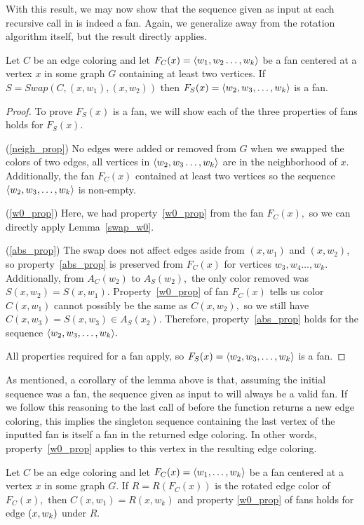 With this result, we may now show that the sequence given as input at each recursive call in  is indeed a fan. Again, we generalize away from the rotation algorithm itself, but the result directly applies.
\begin{lemma}\label{rot_fan}
    Let $C$ be an edge coloring and let $F_C(x) = \langle w_1, w_2 \dots, w_k \rangle$ be a fan centered at a vertex $x$ in some graph $G$ containing at least two vertices. If $S = Swap(C, (x, w_1), (x, w_2))$ then $F_S(x) = \langle w_2, w_3, \dots, w_k \rangle$ is a fan.
\end{lemma}
\begin{proof}
    To prove $F_S(x)$ is a fan, we will show each of the three properties of fans holds for $F_S(x).$
    
    (\ref{neigh_prop}) No edges were added or removed from $G$ when we swapped the colors of two edges, all vertices in $\langle w_2, w_3 \dots, w_k \rangle$ are in the neighborhood of $x.$ Additionally, the fan $F_C(x)$ contained at least two vertices so the sequence $\langle w_2, w_3, \dots, w_k \rangle$ is non-empty.

    (\ref{w0_prop}) Here, we had property~\ref{w0_prop} from the fan $F_C(x),$ so we can directly apply Lemma~\ref{swap_w0}.

    (\ref{abs_prop}) The swap does not affect edges aside from $(x, w_1)$ and $(x, w_2)$, so property~\ref{abs_prop} is preserved from $F_C(x)$ for vertices $w_3, w_4 \dots, w_k.$ Additionally, from $A_C(w_2)$ to $A_S(w_2),$ the only color removed was $S(x, w_2) = S(x, w_1).$ Property~\ref{w0_prop} of fan $F_C(x)$ tells us color $C(x, w_1)$ cannot possibly be the same as $C(x, w_2),$ so we still have $C(x, w_3) = S(x, w_3) \in A_S(x_2).$ Therefore, property~\ref{abs_prop} holds for the sequence $\langle w_2, w_3, \dots, w_k \rangle.$
    
    All properties required for a fan apply, so $F_{S}(x) = \langle w_2, w_3, \dots, w_k \rangle$ is a fan.
\end{proof}
As mentioned, a corollary of the lemma above is that, assuming the initial sequence was a fan, the sequence given as input to  will always be a valid fan. If we follow this reasoning to the last call of  before the function returns a new edge coloring, this implies the singleton sequence containing the last vertex of the inputted fan is itself a fan in the returned edge coloring. In other words, property~\ref{w0_prop} applies to this vertex in the resulting edge coloring.
\begin{cor}\label{rot_w0_prop}
    Let $C$ be an edge coloring and let $F_C(x) = \langle w_1, \dots, w_k \rangle$ be a fan centered at a vertex $x$ in some graph $G.$ If $R = R(F_C(x))$ is the rotated edge color of $F_C(x),$ then $C(x, w_1) = R(x, w_k)$ and property \ref{w0_prop} of fans holds for edge $(x, w_k)$ under $R.$
\end{cor}

